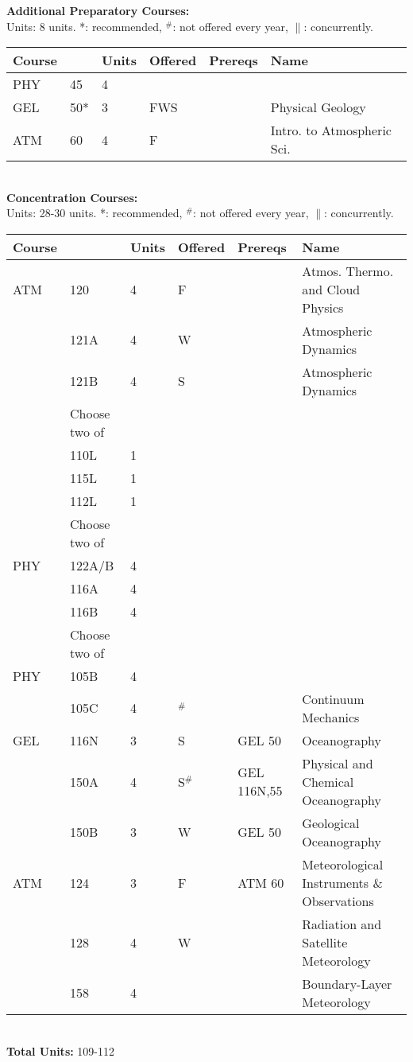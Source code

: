 \documentclass[12pt]{article}
\begin{document}
\newpage
{}
\vskip 0.25cm
\noindent
{\bf Additional Preparatory Courses:  }\\
Units:  8 units. *: recommended, $^\#$: not offered every year, $\parallel$: concurrently.\\
\begin{tabular}{|llllll|}
\hline
Course & & Units & Offered & Prereqs & Name \\
\hline
PHY & 45     & 4 &     & & \\
GEL & 50*    & 3 & FWS & & Physical Geology \\
ATM & 60     & 4 & F   & & Intro. to Atmospheric Sci. \\
\hline
\end{tabular}\\
\vskip 0.25cm
\noindent
{\bf Concentration Courses:  }\\
Units:  28-30 units. *: recommended, $^\#$: not offered every year, $\parallel$: concurrently.\\
\begin{tabular}{|llllll|}
\hline
Course & & Units & Offered & Prereqs & Name \\
\hline
ATM & 120    & 4 & F   & & Atmos. Thermo. and Cloud Physics \\
    & 121A   & 4 & W   & & Atmospheric Dynamics \\
    & 121B   & 4 & S   & & Atmospheric Dynamics \\
\hline
    & Choose two of & & & & \\
\hline
    & 110L & 1 & & & \\
    & 115L & 1 & & & \\
    & 112L & 1 & & & \\
\hline
\hline
    & Choose two of & & & & \\
\hline
PHY & 122A/B & 4 & & & \\
    & 116A   & 4 & & & \\
    & 116B   & 4 & & & \\
\hline
\hline
    & Choose two of & & & & \\
\hline
PHY  & 105B   & 4 & & & \\
     & 105C   & 4 & $^\#$  &             & Continuum Mechanics\\
GEL  & 116N   & 3 & S  & GEL 50      & Oceanography\\
     & 150A   & 4 & S$^\#$ & GEL 116N,55 & Physical and Chemical Oceanography\\
     & 150B   & 3 & W  & GEL 50      & Geological Oceanography\\
ATM  & 124    & 3 & F  & ATM 60      & Meteorological Instruments \& Observations \\
     & 128    & 4 & W  &             & Radiation and Satellite Meteorology \\
     & 158    & 4 &    &             & Boundary-Layer Meteorology \\
\hline
\end{tabular}\\
\vskip 0.25cm
\noindent
{\bf Total Units:} 109-112 \\
\end{document}
